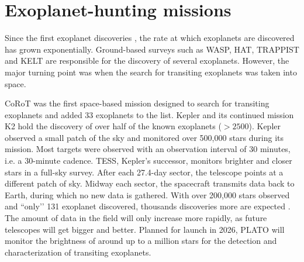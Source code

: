 
\section{Exoplanet-hunting missions}

Since the first exoplanet discoveries , the rate at which exoplanets are discovered has grown exponentially. Ground-based surveys such as WASP, HAT, TRAPPIST and KELT  are responsible for the discovery of several exoplanets. However, the major turning point was when the search for transiting exoplanets was taken into space.

CoRoT was the first space-based mission designed to search for transiting exoplanets and added 33 exoplanets to the list. Kepler and its continued mission K2 hold the discovery of over half of the known exoplanets ($>2500$).
Kepler observed a small patch of the sky and monitored over 500,000 stars during its mission. Most targets were observed with an observation interval of 30 minutes, i.e. a 30-minute cadence. TESS, Kepler’s successor, monitors brighter and closer stars in a full-sky survey. After each 27.4-day sector, the telescope points at a different patch of sky. Midway each sector, the spacecraft transmits data back to Earth, during which no new data is gathered. With over 200,000 stars observed and ``only’’ 131 exoplanet discovered, thousands discoveries more are expected . The amount of data in the field will only increase more rapidly, as future telescopes will get bigger and better.
Planned for launch in 2026, PLATO will monitor the brightness of around up to a million stars for the detection and characterization of transiting exoplanets.

